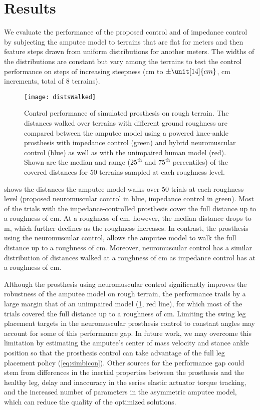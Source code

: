 \section{Results}\label{sec:completed_comparison_results}

We evaluate the performance of the proposed control and of impedance control by
subjecting the amputee model to terrains that are flat for \unit[10]{meters} and
then feature steps drawn from uniform distributions for another
\unit[90]{meters}.  The widths of the distributions are constant but vary among
the terrains to test the control performance on steps of increasing steepness
(\unit[0]{cm} to $\pm \unit[14]{cm}$, \unit[2]{cm} increments, total of 8
terrains). 

\begin{figure}[t]
    \centering
    \texttt{[image: distsWalked]}
    \caption{Control performance of simulated prosthesis on rough terrain. The
    distances walked over terrains with different ground roughness are compared
    between the amputee model using a powered knee-ankle prosthesis with
    impedance control (green) and hybrid neuromuscular control (blue) as well
    as with the unimpaired human model (red). Shown are the median and range
    ($25^\textrm{th}$ and $75^\textrm{th}$ percentiles) of the covered
    distances for 50 terrains sampled at each roughness level.
    }\label{fig:distsWalked}
\end{figure}
 shows the distances the amputee model walks over 50
trials at each roughness level (proposed neuromuscular control in blue,
impedance control in green). Most of the trials with the impedance-controlled
prosthesis cover the full distance up to a roughness of \unit[2]{cm}. At a
roughness of \unit[4]{cm}, however, the median distance drops to \unit[34]{m},
which further declines as the roughness increases. In contrast, the  prosthesis
using the neuromuscular control, allows the amputee model to walk the full
distance up to a roughness of \unit[6]{cm}. Moreover, neuromuscular control has
a similar distribution of distances walked at a roughness of \unit[8]{cm} as
impedance control has at a roughness of \unit[4]{cm}.

Although the prosthesis using neuromuscular control significantly improves the
robustness of the amputee model on rough terrain, the performance trails by a
large margin that of an unimpaired model (\cref{fig:distsWalked}, red line), for
which most of the trials covered the full distance up to a roughness of
\unit[10]{cm}.  Limiting the swing leg placement targets in the neuromuscular
prosthesis control to constant angles may account for some of this performance
gap. In future work, we may overcome this limitation by estimating the amputee's
center of mass velocity and stance ankle position so that the prosthesis control
can take advantage of the full leg placement policy (\cref{eq:simbicon}). Other
sources for the performance gap could stem from differences in the inertial
properties between the prosthesis and the healthy leg, delay and inaccuracy in
the series elastic actuator torque tracking, and the increased number of
parameters in the asymmetric amputee model, which can reduce the quality of the
optimized solutions.

